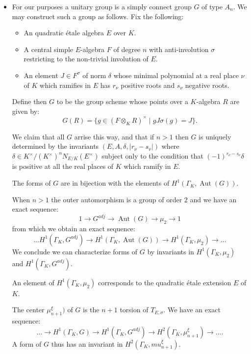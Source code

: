 \documentclass{article}
\theoremstyle{plain}
\theoremstyle{definition}
\DeclareMathOperator{\Aut}{Aut}
\newcommand{\GalKbK}{\Gamma_K}
\begin{document}
\begin{itemize}
\item 

For our purposes a unitary group is a simply connect group $G$ of type $A_n$.
We may construct such a group as follows.
Fix the following:
\begin{itemize}
\item An quadratic \'etale algebra $E$ over $K$.
\item A central simple $E$-algebra $F$ of degree $n$ with anti-involution $\sigma$ restricting to the non-trivial involution of $E$.
\item An element $J\in F^\sigma$ of norm $\delta$ whose minimal polynomial at a real place $\nu$ of $K$ which ramifies in $E$ has $r_\nu$ positive roots and $s_\nu$ negative roots.
\end{itemize}
Define then $G$ to be the group scheme whose points over a $K$-algebra $R$ are given by:
\[ G(R) = \{ g\in (F\otimes_K R)^\times \mid gJ\sigma(g) = J \}. \]

We claim that all $G$ arrise this way, and that if $n>1$ then $G$ is uniquely determined by the invariants $(E,A,\delta, \left\vert r_\nu-s_\nu\right\vert)$ where $\delta \in K^\times/(K^\times)^nN_{E/K}(E^\times)$ subject only to the condition that $(-1)^{r_\nu-s_\nu}\delta$ is positive at all the real places of $K$ which ramify in $E$.

The forms of $G$ are in bijection with the elements of $H^1(\GalKbK, \Aut(G))$.

When $n>1$ the outer automorphism is a group of order $2$ and we have an exact sequence:
\[ 1 \rightarrow   G^{adj} \rightarrow \Aut(G) \rightarrow \mu_2  \rightarrow 1 \]
from which we obtain an exact sequence:
\[ \ldots  H^1(\GalKbK, G^{adj})  \rightarrow  H^1(\GalKbK, \Aut(G)) \rightarrow  H^1(\GalKbK, \mu_2) \rightarrow \ldots \]
We conclude we can characterize forms of $G$ by invariants in $H^1(\GalKbK, \mu_2)$ and $H^1(\GalKbK, G^{adj})$.

An element of $H^1(\GalKbK, \mu_2)$ corresponds to the quadratic \'etale extension $E$ of $K$.

The center $\mu_{n+1}^\xi)$ of $G$ is the $n+1$ torsion of $T_{E,\sigma}$.
We have an exact sequence:
\[ \ldots \rightarrow H^1(\GalKbK,G) \rightarrow H^1(\GalKbK, G^{adj}) \rightarrow H^2(\GalKbK, \mu_{n+1}^\xi) \rightarrow \ldots. \]
A form of $G$ thus has an invariant in $H^2(\GalKbK, mu_{n+1}^\xi)$.


\end{itemize}
\end{document}
